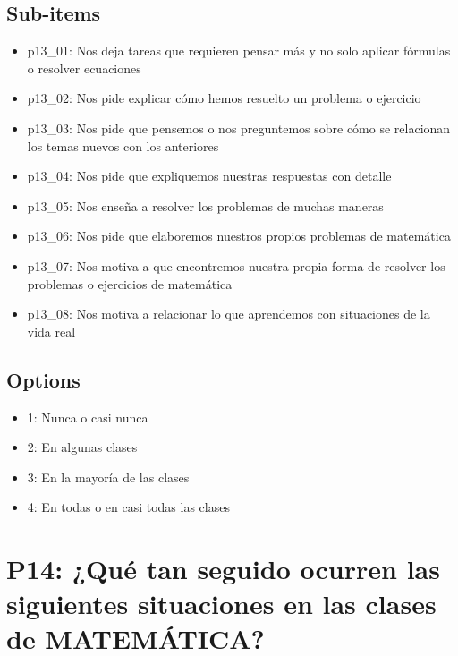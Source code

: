 \documentclass[11pt]{article}
\begin{document}
\subsection*{Sub-items}
\begin{itemize}[leftmargin=*]
  \item p13\_01: Nos deja tareas que requieren pensar más y no solo aplicar fórmulas o resolver ecuaciones
  \item p13\_02: Nos pide explicar cómo hemos resuelto un problema o ejercicio
  \item p13\_03: Nos pide que pensemos o nos preguntemos sobre cómo se relacionan los temas nuevos con los anteriores
  \item p13\_04: Nos pide que expliquemos nuestras respuestas con detalle
  \item p13\_05: Nos enseña a resolver los problemas de muchas maneras
  \item p13\_06: Nos pide que elaboremos nuestros propios problemas de matemática
  \item p13\_07: Nos motiva a que encontremos nuestra propia forma de resolver los problemas o ejercicios de matemática
  \item p13\_08: Nos motiva a relacionar lo que aprendemos con situaciones de la vida real
\end{itemize}
\subsection*{Options}
\begin{itemize}[leftmargin=*]
  \item 1: Nunca o casi nunca
  \item 2: En algunas clases
  \item 3: En la mayoría de las clases
  \item 4: En todas o en casi todas las clases
\end{itemize}
\bigskip
\section*{P14: ¿Qué tan seguido ocurren las siguientes situaciones en las clases de MATEMÁTICA?}
\end{document}
